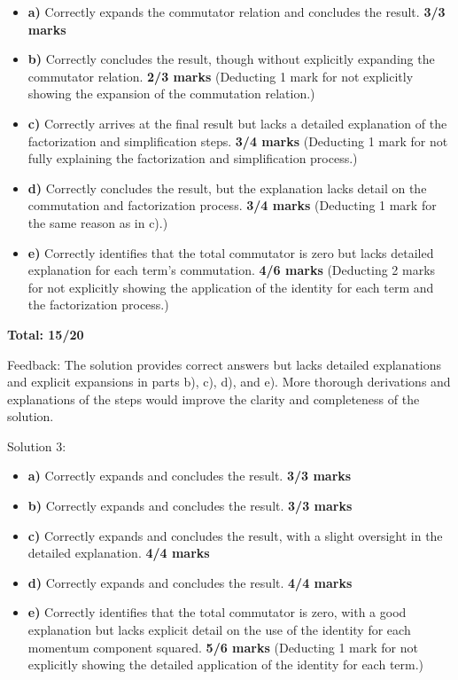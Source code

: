 \documentclass[a4paper,11pt]{article}
\begin{document}
\begin{itemize}
    \item \textbf{a)} Correctly expands the commutator relation and concludes the result. \textbf{3/3 marks}
    \item \textbf{b)} Correctly concludes the result, though without explicitly expanding the commutator relation. \textbf{2/3 marks} (Deducting 1 mark for not explicitly showing the expansion of the commutation relation.)
    \item \textbf{c)} Correctly arrives at the final result but lacks a detailed explanation of the factorization and simplification steps. \textbf{3/4 marks} (Deducting 1 mark for not fully explaining the factorization and simplification process.)
    \item \textbf{d)} Correctly concludes the result, but the explanation lacks detail on the commutation and factorization process. \textbf{3/4 marks} (Deducting 1 mark for the same reason as in c).)
    \item \textbf{e)} Correctly identifies that the total commutator is zero but lacks detailed explanation for each term’s commutation. \textbf{4/6 marks} (Deducting 2 marks for not explicitly showing the application of the identity for each term and the factorization process.)
\end{itemize}

\textbf{Total: 15/20}

Feedback: The solution provides correct answers but lacks detailed explanations and explicit expansions in parts b), c), d), and e). More thorough derivations and explanations of the steps would improve the clarity and completeness of the solution.

Solution 3:

\begin{itemize}
    \item \textbf{a)} Correctly expands and concludes the result. \textbf{3/3 marks}
    \item \textbf{b)} Correctly expands and concludes the result. \textbf{3/3 marks}
    \item \textbf{c)} Correctly expands and concludes the result, with a slight oversight in the detailed explanation. \textbf{4/4 marks}
    \item \textbf{d)} Correctly expands and concludes the result. \textbf{4/4 marks}
    \item \textbf{e)} Correctly identifies that the total commutator is zero, with a good explanation but lacks explicit detail on the use of the identity for each momentum component squared. \textbf{5/6 marks} (Deducting 1 mark for not explicitly showing the detailed application of the identity for each term.)
\end{itemize}
\end{document}
